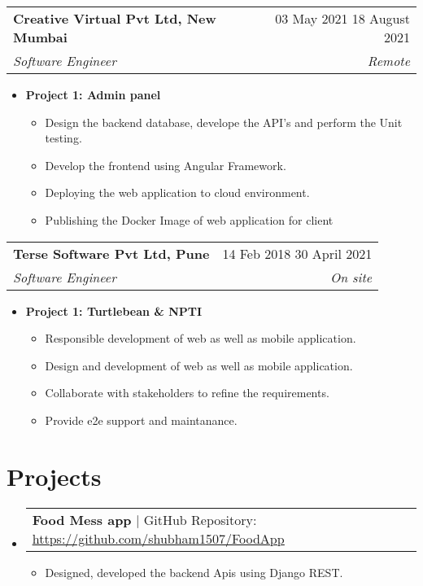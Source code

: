 \documentclass[letterpaper, 11pt]{article}
\makeatletter
\newcommand{\resumeItem}[1]{
    \item \small {
        {#1 \vspace{-3pt}}
    }
}
\newcommand{\resumeSubheading}[4]{
  \vspace{-2pt}\item
    \begin{tabular*}{0.99\textwidth}[t]{l@{\extracolsep{\fill}}r}
      \textbf{#1} & #2 \\
      \textit{\small#3} & \textit{\small #4} \\
    \end{tabular*}\vspace{-7pt}
}
\newcommand{\resumeProjectHeading}[2]{
    \item
    \begin{tabular*}{0.99\textwidth}{l@{\extracolsep{\fill}}r}
      \small#1 & \textit{#2}\\
    \end{tabular*}\vspace{-7pt}
}
\newcommand{\resumeItemListStart}{\begin{itemize}[leftmargin=0.25in, label={\textbullet}]}
\newcommand{\resumeItemListEnd}{\end{itemize}\vspace{-10pt}}
\newcommand{\resumeSubHeadingListStart}{\begin{itemize}[leftmargin=0.15in, label={}]}
\newcommand{\resumeSubHeadingListEnd}{\end{itemize}}
\makeatother
\begin{document}
        \vspace{10pt} %

        \resumeSubheading{Creative Virtual Pvt Ltd, New Mumbai}{03 May 2021 \textendash{} 18 August 2021}
            {Software Engineer}{Remote}
            \resumeItemListStart{}
                \item[] \textbf{Project 1: Admin panel}
                \begin{itemize}[leftmargin=0.5in, label={\textbullet}]
                    \item Design the backend database, develope the API’s and perform the Unit
                    testing.
                    \item Develop the frontend using Angular Framework.
                    \item Deploying the web application to cloud environment.
                    \item Publishing the Docker Image of web application for client
                \end{itemize}
            \resumeItemListEnd{}
    
            \vspace{10pt} %

            \resumeSubheading{Terse Software Pvt Ltd, Pune}{14 Feb 2018 \textendash{} 30 April 2021}
                { Software Engineer}{On site}
                \resumeItemListStart{}
                    \item[] \textbf{Project 1: Turtlebean & NPTI}
                    \begin{itemize}[leftmargin=0.5in, label={\textbullet}]
                        \item Responsible development of web as well as mobile application.
                        \item Design and development of web as well as mobile application.
                        \item Collaborate with stakeholders to refine the requirements.
                        \item Provide e2e support and maintanance.
                    \end{itemize}
                \resumeItemListEnd{}
        
   
    
   
\vspace{-17pt}

\section{Projects}
\resumeSubHeadingListStart{}
    \resumeProjectHeading{\textbf{Food Mess app} $|$ GitHub Repository: \underline{\url{https://github.com/shubham1507/FoodApp}}}{}
    \vspace{10pt}
        \resumeItemListStart{}
            \resumeItem{Designed, developed the backend Apis using Django REST.}
        \resumeItemListEnd{}
\resumeSubHeadingListEnd{}
\end{document}
